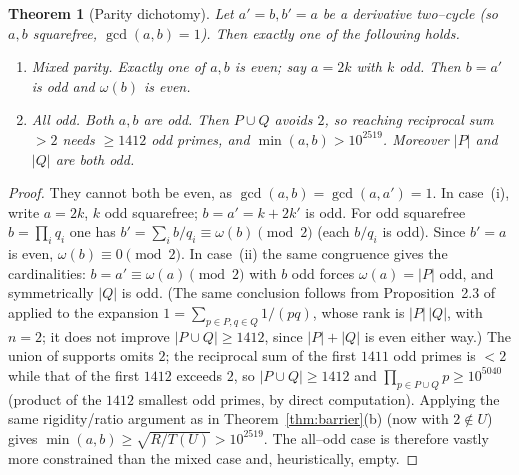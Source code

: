 \documentclass[11pt]{article}
\newtheorem{theorem}{Theorem}[section]
\theoremstyle{definition}
\begin{document}
\begin{theorem}[Parity dichotomy]\label{thm:parity}
Let $a'=b,b'=a$ be a derivative two--cycle (so $a,b$ squarefree, $\gcd(a,b)=1$). Then exactly one of
the following holds.
\begin{enumerate}[label=\textup{(\roman*)},leftmargin=2.2em]
\item \emph{Mixed parity.} Exactly one of $a,b$ is even; say $a=2k$ with $k$ odd. Then $b=a'$ is odd
and $\omega(b)$ is even.
\item \emph{All odd.} Both $a,b$ are odd. Then $P\cup Q$ avoids $2$, so reaching reciprocal sum $>2$
needs $\ge 1412$ odd primes, and $\min(a,b)>10^{2519}$. Moreover $|P|$ and $|Q|$ are both odd.
\end{enumerate}
\end{theorem}

\begin{proof}
They cannot both be even, as $\gcd(a,b)=\gcd(a,a')=1$. In case~(i), write $a=2k$, $k$ odd squarefree;
$b=a'=k+2k'$ is odd. For odd squarefree $b=\prod_{i}q_i$ one has
$b'=\sum_i b/q_i\equiv \omega(b)\pmod 2$ (each $b/q_i$ is odd). Since $b'=a$ is even,
$\omega(b)\equiv0\pmod2$. In case~(ii) the same congruence gives the cardinalities: $b=a'\equiv\omega(a)\pmod2$ with $b$ odd
forces $\omega(a)=|P|$ odd, and symmetrically $|Q|$ is odd. \textup{(}The same conclusion follows
from Proposition~2.3 of \cite{FewPrimes2025} applied to the expansion
$1=\sum_{p\in P,q\in Q}1/(pq)$, whose rank is $|P|\,|Q|$, with $n=2$; it does not improve
$|P\cup Q|\ge1412$, since $|P|+|Q|$ is even either way.\textup{)} The union of supports omits $2$;
the reciprocal sum of the first $1411$ odd primes is $<2$ while that of the first $1412$ exceeds
$2$, so $|P\cup Q|\ge 1412$
and $\prod_{p\in P\cup Q}p\ge 10^{5040}$ (product of the $1412$ smallest odd primes, by direct
computation). Applying the same rigidity/ratio argument as in Theorem~\ref{thm:barrier}(b) (now
with $2\notin U$) gives $\min(a,b)\ge\sqrt{R/T(U)}>10^{2519}$. The all--odd case is therefore
vastly more constrained than the mixed case and, heuristically, empty.
\end{proof}
\end{document}
